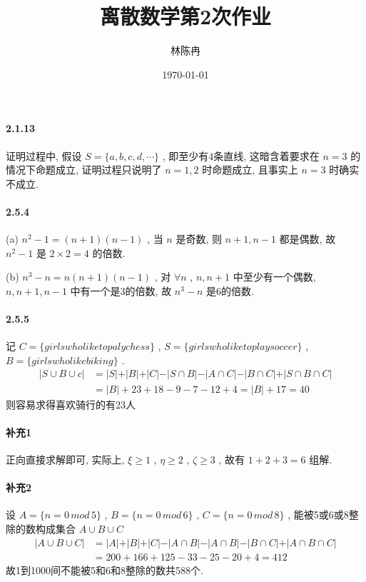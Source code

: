 \documentclass[a4paper, UTF8]{ctexart}				%
\title{离散数学第2次作业}
\author{林陈冉}
\date{\today}
\numberwithin{equation}{section}				%
\begin{document}
    \maketitle										%
    \paragraph{2.1.13} 
        证明过程中, 假设 $S = \{a, b, c, d, \cdots\}$ , 即至少有4条直线, 这暗含着要求在 $n = 3$ 的情况下命题成立, 证明过程只说明了 $n = 1, 2$ 时命题成立, 且事实上 $n = 3$ 时确实不成立.
    \paragraph{2.5.4}
        (a) $n^2 - 1 = (n+1)(n-1)$ , 当 $n$ 是奇数, 则 $n + 1, n-1$ 都是偶数, 
        故 $n^2 - 1$ 是 $2 \times 2 = 4$ 的倍数.

        (b) $n^3 - n = n(n + 1)(n - 1)$ , 对 $\forall n$ , $n, n + 1$ 中至少有一个偶数, $n, n + 1, n - 1$ 中有一个是3的倍数, 故 $n^3 - n$ 是6的倍数.
    \paragraph{2.5.5}
        记 $C = \{girls who like to paly chess\}$ , $S = \{girls who like to  play soccer\}$ , $B = \{girls who like biking\}$ .
        \begin{equation*}
            \begin{split}
                \vert{S \cup B \cup c}\vert
                & = \vert{S}\vert + \vert{B}\vert + \vert{C}\vert - \vert{S \cap B}\vert - \vert{A \cap C}\vert - \vert{B \cap C}\vert + \vert{S \cap B \cap C}\vert\\
                & = \vert{B}\vert + 23 + 18 - 9 - 7 - 12 + 4 
                  = \vert{B}\vert +17 = 40
            \end{split}
        \end{equation*}
        则容易求得喜欢骑行的有23人
    \paragraph{补充1} 
        正向直接求解即可, 实际上, $\xi \ge 1$ , $\eta \ge 2$ , $\zeta \ge 3$ , 故有 $1 + 2 + 3 = 6$ 组解.
    \paragraph{补充2} 
        设 $A = \{n=0\,mod\,5\}$ , $B = \{n=0\,mod\,6\}$ , $C = \{n=0\,mod\,8\}$ , 能被5或6或8整除的数构成集合 $A \cup B \cup C$
        \begin{equation}
            \begin{split}
                \vert{A \cup B \cup C}\vert
                & = \vert{A}\vert + \vert{B}\vert + \vert{C}\vert - \vert{A \cap B}\vert - \vert{A \cap B}\vert - \vert{B \cap C}\vert + \vert{A \cap B \cap C}\vert\\
                & = 200 + 166 + 125 - 33 - 25 - 20 + 4 = 412
            \end{split}
        \end{equation}
        故1到1000间不能被5和6和8整除的数共588个.
\end{document}
